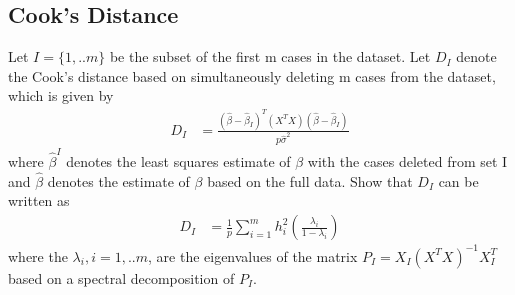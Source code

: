 \documentclass[11pt]{article} %
\begin{document}
\subsection{Cook's Distance}
 Let $I = \{ 1,.. m\}$ be the subset of the first m cases in the dataset. Let $D_I$ denote the Cook's distance based on simultaneously deleting m cases from the dataset, which is given by
\begin{align*}
	D_I & = \frac{(\hat{\beta} - \hat{\beta}_I)^T (X^T X) (\hat{\beta} - \hat{\beta}_I)}{p \hat{\sigma}^2}
\end{align*} 
where $\hat{\beta}^I$ denotes the least squares estimate of $\beta$ with the cases deleted from set I and $\hat{\beta}$ denotes the estimate of $\beta$ based on the full data. Show that $D_I$ can be written as 
\begin{align*}
	D_I & = \frac{1}{p} \sum_{i=1}^m h_i^2 \left( \frac{\lambda_i}{1- \lambda_i} \right)
\end{align*} 	
where the $\lambda_i, i=1,..m$, are the eigenvalues of the matrix $P_I = X_I (X^T X)^{-1} X_I^T$ based on a spectral decomposition of $P_I$.
 
 
\end{document}
